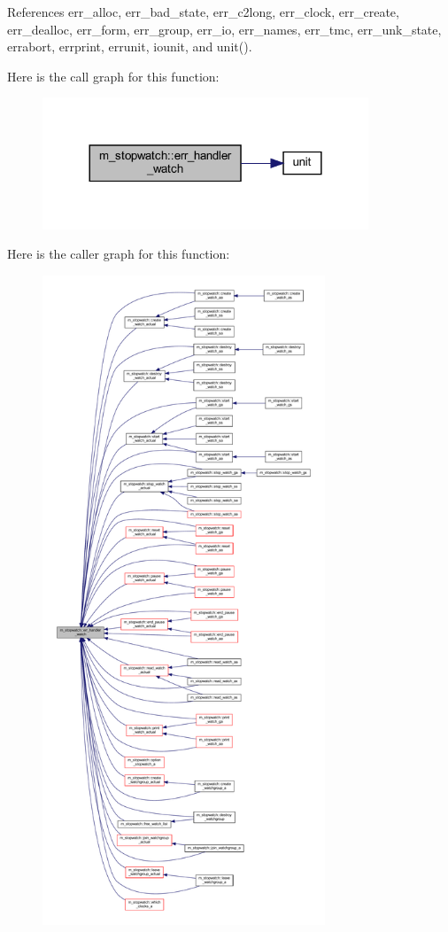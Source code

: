 References err\+\_\+alloc, err\+\_\+bad\+\_\+state, err\+\_\+c2long, err\+\_\+clock, err\+\_\+create, err\+\_\+dealloc, err\+\_\+form, err\+\_\+group, err\+\_\+io, err\+\_\+names, err\+\_\+tmc, err\+\_\+unk\+\_\+state, errabort, errprint, errunit, iounit, and unit().

Here is the call graph for this function\+:
\nopagebreak
\begin{figure}[H]
\begin{center}
\leavevmode
\includegraphics[width=276pt]{namespacem__stopwatch_a8129c70e425409f9dc6666729f5b5c9c_cgraph}
\end{center}
\end{figure}
Here is the caller graph for this function\+:
\nopagebreak
\begin{figure}[H]
\begin{center}
\leavevmode
\includegraphics[height=550pt]{namespacem__stopwatch_a8129c70e425409f9dc6666729f5b5c9c_icgraph}
\end{center}
\end{figure}
